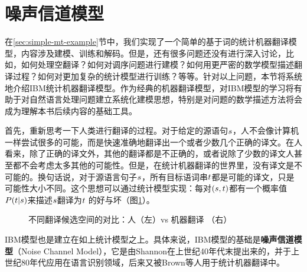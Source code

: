 
\sectionnewpage
\section{噪声信道模型}

\vspace{0.5em}

\parinterval 在\ref{sec:simple-mt-example}节中，我们实现了一个简单的基于词的统计机器翻译模型，内容涉及建模、训练和解码。但是，还有很多问题还没有进行深入讨论，比如，如何处理空翻译？如何对调序问题进行建模？如何用更严密的数学模型描述翻译过程？如何对更加复杂的统计模型进行训练？等等。针对以上问题，本节将系统地介绍IBM统计机器翻译模型。作为经典的机器翻译模型，对IBM模型的学习将有助于对自然语言处理问题建立系统化建模思想，特别是对问题的数学描述方法将会成为理解本书后续内容的基础工具。

\parinterval 首先，重新思考一下人类进行翻译的过程。对于给定的源语句${s}$，人不会像计算机一样尝试很多的可能，而是快速准确地翻译出一个或者少数几个正确的译文。在人看来，除了正确的译文外，其他的翻译都是不正确的，或者说除了少数的译文人甚至都不会考虑太多其他的可能性。但是，在统计机器翻译的世界里，没有译文是不可能的。换句话说，对于源语言句子${s}$，所有目标语词串${t}$都是可能的译文，只是可能性大小不同。这个思想可以通过统计模型实现：每对$({s},{t})$都有一个概率值${P}({t}|{s})$来描述${s}$翻译为${t}$ 的好与坏（图\ref{fig:5-12}）。

\begin{figure}[htp]
    \centering

\caption{不同翻译候选空间的对比：人（左）vs 机器翻译 （右）}
    \label{fig:5-12}
\end{figure}

\vspace{-0.5em}
\parinterval IBM模型也是建立在如上统计模型之上。具体来说，IBM模型的基础是{\small\sffamily\bfseries{噪声信道模型}}（Noise Channel Model），它是由Shannon在上世纪40年代末提出来的，并于上世纪80年代应用在语言识别领域，后来又被Brown等人用于统计机器翻译中。

